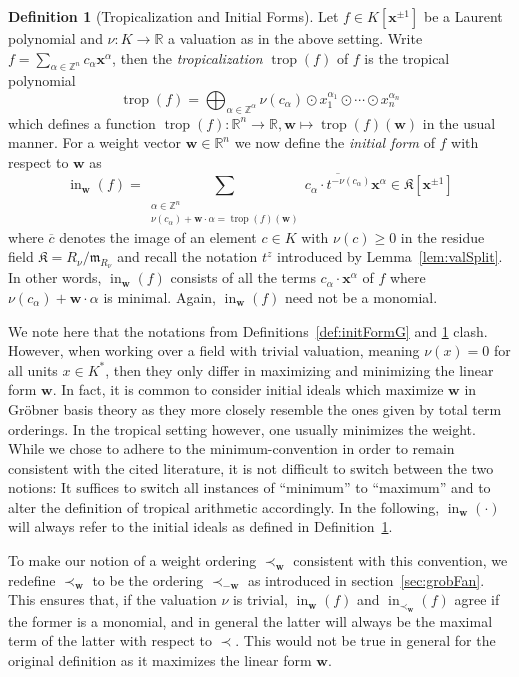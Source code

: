 \documentclass[
  paper=a4,
  titlepage,
  bibliography=totoc,
  pagesize=pdftex
]{scrartcl}
\numberwithin{figure}{section}
\numberwithin{equation}{section}
\numberwithin{table}{section}
\newcommand*\setZ{\mathds{Z}}
\newcommand*\setR{\mathds{R}}
\let\vec\mathbf
\DeclareMathOperator{\trop}{trop}
\DeclareMathOperator{\initial}{in}
\theoremstyle{definition}
\newtheorem{definition}{Definition}
\numberwithin{definition}{section}
\begin{document}
\begin{definition}[Tropicalization and Initial Forms]
  \label{def:initialId}
  Let $f \in K[\vec x^{\pm1}]$ be a Laurent polynomial and $\nu : K \to \setR$ a valuation
  as in the above setting. Write $f = \sum_{\alpha \in \setZ^n} c_\alpha \vec x^\alpha$,
  then the \emph{tropicalization} $\trop(f)$ of $f$ is the tropical polynomial
  \[
    \trop(f) = \bigoplus_{\alpha\in\setZ^\alpha} \nu(c_\alpha)
    \odot x_1^{\alpha_1}\odot\cdots \odot x_n^{\alpha_n}
  \]
  which defines a function $\trop(f) : \setR^n \to \setR, \vec w \mapsto \trop(f)(\vec w)$
  in the usual manner. For a weight vector $\vec w \in \setR^n$ we now define the
  \emph{initial form} of $f$ with respect to $\vec w$ as
  \[
    \initial_{\vec w}(f) =
    \sum_{ \substack{
        \alpha \in \setZ^n \\
        \nu(c_\alpha) + \vec w\cdot \alpha = \trop(f)(\vec w)
    }} \overline {c_\alpha \cdot t^{-\nu(c_\alpha)} } \vec x^\alpha
    \in \mathfrak K[\vec x^{\pm1}]
  \]
  where $\overline{c}$ denotes the image of an element $c \in K$ with $\nu(c)\geq0$ in the
  residue field $\mathfrak K = R_\nu/\mathfrak m_{R_\nu}$ and recall the notation $t^z$
  introduced by Lemma~\ref{lem:valSplit}. In other words, $\initial_{\vec w}(f)$ consists
  of all the terms $c_\alpha\cdot \vec x^\alpha$ of $f$ where $\nu(c_\alpha)+\vec w\cdot
  \alpha$ is minimal. Again, $\initial_{\vec w}(f)$ need not be a monomial.
\end{definition}

We note here that the notations from Definitions~\ref{def:initFormG} and
\ref{def:initialId} clash. However, when working over a field with trivial valuation,
meaning $\nu(x) = 0$ for all units $x \in K^*$, then they only differ in maximizing and
minimizing the linear form $\vec w$. In fact, it is common to consider initial ideals
which maximize $\vec w$ in Gröbner basis theory as they more closely resemble the ones
given by total term orderings. In the tropical setting however, one usually minimizes
the weight. While we chose to adhere to the minimum-convention in order to remain
consistent with the cited literature, it is not difficult to switch between the two
notions: It suffices to switch all instances of \enquote{minimum} to \enquote{maximum} and
to alter the definition of tropical arithmetic accordingly. In the following,
$\initial_{\vec w}(\cdot)$ will always refer to the initial ideals as defined in
Definition~\ref{def:initialId}.

To make our notion of a weight ordering $\prec_{\vec w}$ consistent with this convention,
we redefine $\prec_{\vec w}$ to be the ordering $\prec_{-\vec w}$ as introduced in
section~\ref{sec:grobFan}. This ensures that, if the valuation $\nu$ is trivial,
$\initial_{\vec w}(f)$ and $\initial_{\prec_{\vec w}}(f)$ agree if the former is a
monomial, and in general the latter will always be the maximal term of the latter with
respect to $\prec$. This would not be true in general for the original definition as it
maximizes the linear form $\vec w$.
\end{document}
